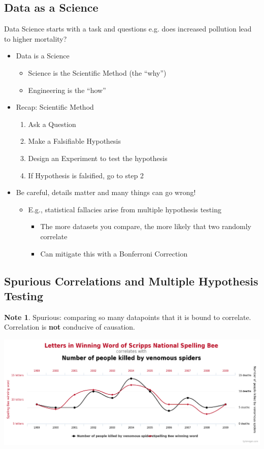 \documentclass[11pt]{article}
\theoremstyle{definition}
\newtheorem{note}{Note}
\begin{document}
\subsection{Data as a Science}
Data Science starts with a task and questions
e.g. does increased pollution lead to higher mortality?
\begin{itemize}
  \item Data is a Science
  \begin{itemize}
    \item Science is the Scientific Method (the “why”)
    \item Engineering is the “how”
  \end{itemize}
  \item Recap: Scientific Method
  \begin{enumerate}
    \item Ask a Question
    \item Make a Falsifiable Hypothesis
    \item Design an Experiment to test the hypothesis
    \item If Hypothesis is falsified, go to step 2
  \end{enumerate}
  \item Be careful, details matter and many things can go wrong!
  \begin{itemize}
    \item E.g., statistical fallacies arise from multiple hypothesis testing
    \begin{itemize}
      \item The more datasets you compare, the more likely that two randomly correlate
      \item Can mitigate this with a Bonferroni Correction
    \end{itemize}
  \end{itemize}
\end{itemize}
\subsection{Spurious Correlations and Multiple Hypothesis Testing}
\begin{note}
  Spurious: comparing so many datapoints that it is bound to correlate. 
  Correlation is \textbf{not} conducive of causation.
\end{note}
\includegraphics[width = \textwidth]{5.png}
\newpage
\end{document}
